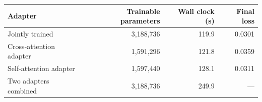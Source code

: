 \begin{tabular}{lrrr}
\toprule
Adapter & Trainable parameters & Wall clock (s) & Final loss \\
\midrule
Jointly trained & 3,188,736 & 119.9 & 0.0301 \\
Cross-attention adapter & 1,591,296 & 121.8 & 0.0359 \\
Self-attention adapter & 1,597,440 & 128.1 & 0.0311 \\
\midrule
Two adapters combined & 3,188,736 & 249.9 & --- \\
\bottomrule
\end{tabular}
